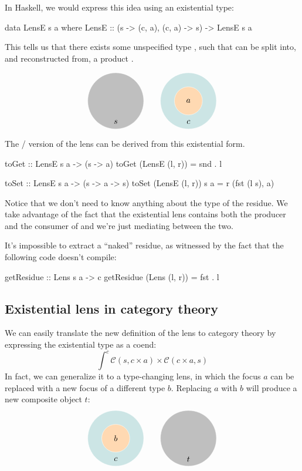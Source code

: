 \documentclass[DaoFP]{subfiles}
\begin{document}
In Haskell, we would express this idea using an existential type:
\begin{haskell}
data LensE s a where
    LensE :: (s -> (c, a), (c, a) -> s) -> LensE s a
\end{haskell}
This tells us that there exists some unspecified type , such that  can be split into, and reconstructed from, a product . 

\[
\begin{tikzpicture}
\filldraw[fill=gray!50, draw=white] (0, 0) circle (1.2);
\node at (0, -0.9) {$s$};
\end{tikzpicture}
\hspace{20pt}
\begin{tikzpicture}
\filldraw[fill=blue!50!green!20, draw=white] (0, 0) circle (1.2);
\filldraw[fill=orange!30, draw=white] (0, 0) circle (0.6);
\node at (0, 0) {$a$};
\node at (0, -0.9) {$c$};
\end{tikzpicture}
\]


The / version of the lens can be derived from this existential form.
\begin{haskell}
toGet :: LensE s a -> (s -> a)
toGet (LensE (l, r)) = snd . l

toSet :: LensE s a -> (s -> a -> s)
toSet (LensE (l, r)) s a = r (fst (l s), a)
\end{haskell}

Notice that we don't need to know anything about the type of the residue. We take advantage of the fact that the existential lens contains both the producer and the consumer of  and we're just mediating between the two.

It's impossible to extract a ``naked'' residue, as witnessed by the fact that the following code doesn't compile:
\begin{haskell}
getResidue :: Lens s a -> c
getResidue (Lens (l, r)) = fst . l
\end{haskell}

\subsection{Existential lens in category theory}

We can easily translate the new definition of the lens to category theory by expressing the existential type as a coend:
\[ \int^{c} \mathcal{C}(s, c \times a) \times  \mathcal{C}(c \times a, s) \]
In fact, we can generalize it to a type-changing lens, in which the focus $a$ can be replaced with a new focus of a different type $b$. Replacing $a$ with $b$ will produce a new composite object $t$:
\[
\begin{tikzpicture}
\filldraw[fill=blue!50!green!20, draw=white] (0, 0) circle (1.2);
\filldraw[fill=orange!30, draw=white] (0, 0) circle (0.6);
\node at (0, 0) {$b$};
\node at (0, -0.9) {$c$};
\end{tikzpicture}
\hspace{20pt}
\begin{tikzpicture}
\filldraw[fill=gray!50, draw=white] (0, 0) circle (1.2);
\node at (0, -0.9) {$t$};
\end{tikzpicture}
\]
\end{document}
